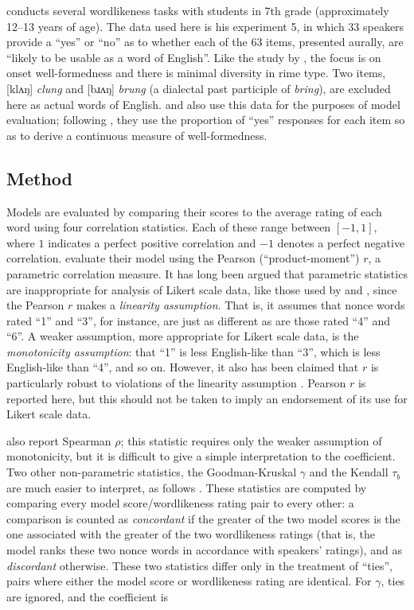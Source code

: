 \citet{Scholes1966} conducts several wordlikeness tasks with students in 7th grade (approximately 12--13 years of age).
The data used here is his experiment 5, in which 33 speakers provide a ``yes'' or ``no'' as to whether each of the 63 items, presented aurally, are ``likely to be usable as a word of English''. 
Like the study by \citet{Albright2007}, the focus is on onset well-formedness and there is minimal diversity in rime type. 
Two items, [klʌŋ] \emph{clung} and [bɹʌŋ] \emph{brung} (a dialectal past participle of \emph{bring}), are excluded here as actual words of English. 
\citet{Albright2009a} and \citet{Hayes2008a} also use this data for the purposes of model evaluation; following \citet{Frisch2000}, they use the proportion of ``yes'' responses for each item so as to derive a continuous measure of well-formedness.

\subsection{Method}

Models are evaluated by comparing their scores to the average rating of each word using four correlation statistics. 
Each of these range between $[-1, 1]$, where $1$ indicates a perfect positive correlation and $-1$ denotes a perfect negative correlation. 
\citet{Hayes2008a} evaluate their model using the Pearson (``product-moment'') $r$, a parametric correlation measure.
It has long been argued \citep[e.g.,][]{Stevens1946} that parametric statistics are inappropriate for analysis of Likert scale data, like those used by \citet{Albright2007} and \citet{Albright2003b}, since the Pearson $r$ makes a \emph{linearity assumption}.
That is, it assumes that nonce words rated ``1'' and  ``3'', for instance, are just as different as are those rated ``4'' and ``6''. 
A weaker assumption, more appropriate for Likert scale data, is the \emph{monotonicity assumption}: that ``1'' is less English-like than ``3'', which is less English-like than ``4'', and so on.
However, it also has been claimed that $r$ is particularly robust to violations of the linearity assumption \citep[e.g.,][]{Havlicek1976}.
Pearson $r$ is reported here, but this should not be taken to imply an endorsement of its use for Likert scale data.

\citeauthor{Hayes2008a} also report Spearman $\rho$; this statistic requires only the weaker assumption of monotonicity, but it is difficult to give a simple interpretation to the coefficient.
Two other non-parametric statistics, the Goodman-Kruskal $\gamma$ and the Kendall $\tau_b$ are much easier to interpret, as follows \citep{Noether1981}. 
These statistics are computed by comparing every model score/wordlikeness rating pair to every other: a comparison is counted as \emph{concordant} if the greater of the two model scores is the one associated with the greater of the two wordlikeness ratings (that is, the model ranks these two nonce words in accordance with speakers' ratings), and as \emph{discordant} otherwise.
These two statistics differ only in the treatment of ``ties'', pairs where either the model score or wordlikeness rating are identical.
For $\gamma$, ties are ignored, and the coefficient is 

